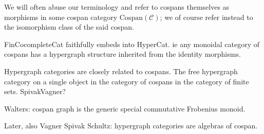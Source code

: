 We will often abuse our terminology and refer to cospans themselves as
morphisms in some cospan category $\mathrm{Cospan}(\mathcal C)$; we of course
refer instead to the isomorphism class of the said cospan.

  
FinCocompleteCat faithfully embeds into HyperCat. ie any monoidal category of
cospans has a hypergraph structure inherited from the identity morphisms.

  Hypergraph categories are closely related to cospans. The free hypergraph
  category on a single object in the category of cospans in the category of
  finite sets. SpivakVagner?

Walters: cospan graph is the generic special commutative Frobenius monoid.

Later, also Vagner Spivak Schultz: hypergraph categories are algebras of cospan.



